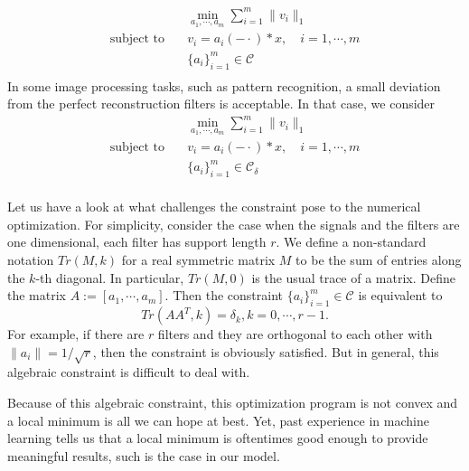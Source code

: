 \documentclass[a4paper]{article}
\begin{document}
\begin{equation}
\label{model:m0}
\begin{aligned}
	&\min_{a_1,\cdots,a_m} \sum_{i=1}^m \|v_i\|_1 \\
	\textrm{subject to} \quad&v_i = a_i(-\cdot)*x,\quad i=1,\cdots,m\\
	 & \{a_i\}_{i=1}^m \in \mathcal{C} \\
\end{aligned}
\end{equation}
In some image processing tasks, such as pattern recognition, a small deviation from the perfect reconstruction filters is acceptable. In that case, we consider
\begin{equation}
\label{model:m1}
\begin{aligned}
	&\min_{a_1,\cdots,a_m} \sum_{i=1}^m \|v_i\|_1 \\
	\textrm{subject to} \quad&v_i = a_i(-\cdot)*x,\quad i=1,\cdots,m\\
	 & \{a_i\}_{i=1}^m \in \mathcal{C_\delta} \\
\end{aligned}
\end{equation}



Let us have a look at what challenges the constraint pose to the numerical optimization. For simplicity, consider the case when the signals and the filters are one dimensional, each filter has support length $r$. We define a non-standard notation $Tr(M,k)$ for a real symmetric matrix $M$ to be the sum of entries along the $k$-th diagonal. In particular, $Tr(M,0)$ is the usual trace of a matrix.
Define the matrix  $A:=[a_1,\cdots,a_m]$. Then the constraint $ \{a_i\}_{i=1}^m \in \mathcal{C}$ is equivalent to 
\[
Tr(AA^T,k)=\delta_k, k=0,\cdots,r-1.
\]
For example, if there are $r$ filters and they are orthogonal to each other with $\|a_i\|=1/\sqrt{r}$, then the constraint is obviously satisfied. But in general, this algebraic constraint is difficult to deal with. 

Because of this algebraic constraint, this optimization program is not convex and a local minimum is all we can hope at best. Yet, past experience in machine learning tells us that a local minimum is oftentimes good enough to provide meaningful results, such is the case in our model.
\end{document}
